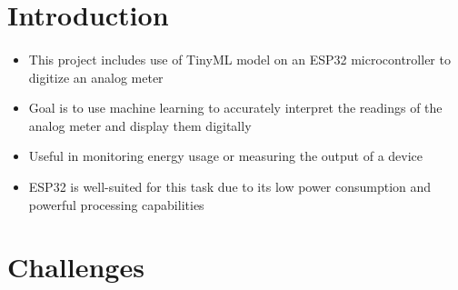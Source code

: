 \section{Introduction}

\STANDARD{\insertsection}
{ 
	\framesubtitle{\insertsubsection}
	
	
	\begin{itemize}
		\item This project includes use of TinyML model on an ESP32 microcontroller to digitize an analog meter
		\item Goal is to use machine learning to accurately interpret the readings of the analog meter and display them digitally
		\item Useful in monitoring energy usage or measuring the output of a device
		\item ESP32 is well-suited for this task due to its low power consumption and powerful processing capabilities
	\end{itemize}
	
	
}

\section{Challenges}

